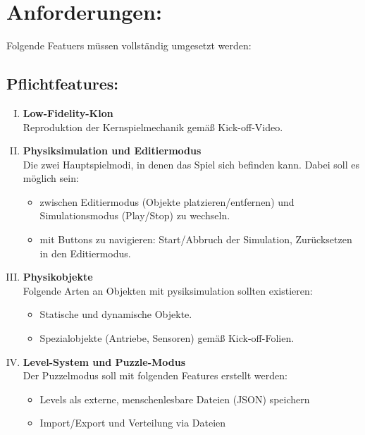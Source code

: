 \documentclass[]{exercise}
\begin{document}
    \section{Anforderungen:}
        Folgende Featuers müssen vollständig umgesetzt werden:
        
    \subsection{Pflichtfeatures:}
        
        \begin{enumerate} [I.]
            \item \textbf{Low-Fidelity-Klon}\\
                Reproduktion der Kernspielmechanik gemäß Kick-off-Video.
            \item \textbf{Physiksimulation und Editiermodus}\\
                Die zwei Hauptspielmodi, in denen das Spiel sich befinden kann. Dabei soll es möglich sein:
                \begin{itemize}
                    \item zwischen Editiermodus (Objekte platzieren/entfernen) und Simulationsmodus (Play/Stop) zu wechseln.
                    \item mit Buttons zu navigieren: Start/Abbruch der Simulation, Zurücksetzen in den Editiermodus.
                \end{itemize}
            \item \textbf{Physikobjekte}\\
                Folgende Arten an Objekten mit pysiksimulation sollten existieren:
                \begin{itemize}
                    \item Statische und dynamische Objekte.
                    \item Spezialobjekte (Antriebe, Sensoren) gemäß Kick-off-Folien.
                \end{itemize}
            \item \textbf{Level-System und Puzzle-Modus}\\
                Der Puzzelmodus soll mit folgenden Features erstellt werden:
                \begin{itemize}
                    \item Levels als externe, menschenlesbare Dateien (JSON) speichern
                    \item Import/Export und Verteilung via Dateien

\end{itemize}
\end{enumerate}
\end{document}
